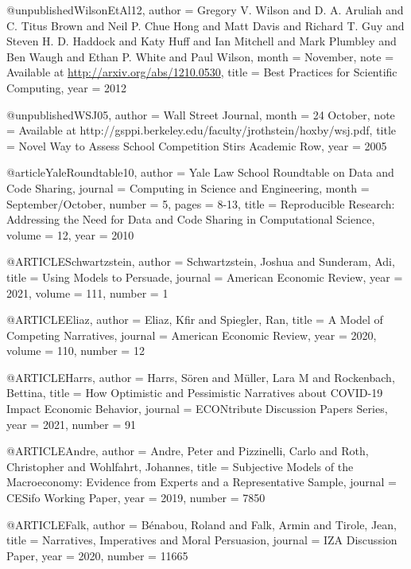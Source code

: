 @unpublished{WilsonEtAl12,
author = {Gregory V. Wilson and D. A. Aruliah and C. Titus Brown and Neil P. Chue Hong and Matt Davis and Richard T. Guy and Steven H. D. Haddock and Katy Huff and Ian Mitchell and Mark Plumbley and Ben Waugh and Ethan P. White and Paul Wilson},
month  = {November},
note   = {Available at \url{http://arxiv.org/abs/1210.0530}},
title  = {Best Practices for Scientific Computing},
year   = {2012}
}

@unpublished{WSJ05,
author = {{Wall Street Journal}},
month  = {{24 October}},
note   = {{Available at http://gsppi.berkeley.edu/faculty/jrothstein/hoxby/wsj.pdf}},
title  = {Novel Way to Assess School Competition Stirs Academic Row},
year   = {2005}
}

@article{YaleRoundtable10,
author  = {{Yale Law School Roundtable on Data and Code Sharing}},
journal = {Computing in Science and Engineering},
month   = {September/October},
number  = {5},
pages   = {8-13},
title   = {Reproducible Research: Addressing the Need for Data and Code Sharing in Computational Science},
volume  = {12},
year    = {2010}
}


@ARTICLE{Schwartzstein,
author =       {Schwartzstein, Joshua  and Sunderam, Adi},
title =        {Using Models to Persuade},
journal =      {American Economic Review},
year =         {2021},
volume =       {111},
number =       {1}
}




@ARTICLE{Eliaz,
author =       {Eliaz, Kfir  and Spiegler, Ran},
title =        {A Model of Competing Narratives},
journal =      {American Economic Review},
year =         {2020},
volume =       {110},
number =       {12}
}


@ARTICLE{Harrs,
author =       {Harrs, Sören and Müller, Lara M and Rockenbach, Bettina},
title =        {How Optimistic and Pessimistic Narratives about COVID-19 Impact Economic Behavior},
journal =      {ECONtribute Discussion Papers Series},
year =         {2021},
number =       {91}
}


@ARTICLE{Andre,
author =       {Andre, Peter and Pizzinelli, Carlo and Roth, Christopher and Wohlfahrt, Johannes},
title =        {Subjective Models of the Macroeconomy: Evidence from Experts and a Representative Sample},
journal =      {CESifo Working Paper},
year =         {2019},
number =       {7850}
}

@ARTICLE{Falk,
author =       {Bénabou, Roland and Falk, Armin and Tirole, Jean},
title =        {Narratives, Imperatives and Moral Persuasion},
journal =      {IZA Discussion Paper},
year =         {2020},
number =       {11665}
}


